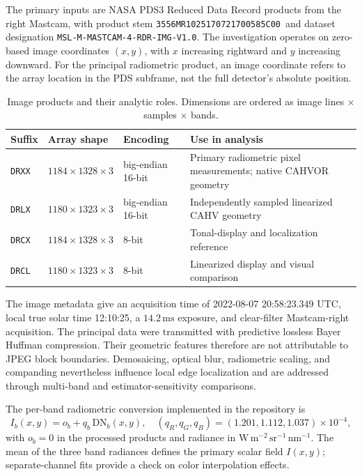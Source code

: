\documentclass[11pt,letterpaper]{article}
\newcommand{\pdsid}{\texttt{3556MR1025170721700585C00}}
\begin{document}
The primary inputs are NASA PDS3 Reduced Data Record products from the right Mastcam, with product stem \pdsid\ and dataset designation \texttt{MSL-M-MASTCAM-4-RDR-IMG-V1.0}. The investigation operates on zero-based image coordinates \((x,y)\), with \(x\) increasing rightward and \(y\) increasing downward. For the principal radiometric product, an image coordinate refers to the array location in the PDS subframe, not the full detector's absolute position.

\begin{table}[ht]
\centering\small
\caption{Image products and their analytic roles. Dimensions are ordered as image lines \(\times\) samples \(\times\) bands.}
\label{tab:products}
\begin{tabularx}{\linewidth}{@{}l l l X@{}}
\toprule
\textbf{Suffix} & \textbf{Array shape} & \textbf{Encoding} & \textbf{Use in analysis} \\
\midrule
\texttt{DRXX} & \(1184\times1328\times3\) & big-endian 16-bit & Primary radiometric pixel measurements; native CAHVOR geometry \\
\texttt{DRLX} & \(1180\times1323\times3\) & big-endian 16-bit & Independently sampled linearized CAHV geometry \\
\texttt{DRCX} & \(1184\times1328\times3\) & 8-bit & Tonal-display and localization reference \\
\texttt{DRCL} & \(1180\times1323\times3\) & 8-bit & Linearized display and visual comparison \\
\bottomrule
\end{tabularx}
\end{table}

The image metadata give an acquisition time of 2022-08-07 20:58:23.349 UTC, local true solar time 12:10:25, a \(14.2\,\mathrm{ms}\) exposure, and clear-filter Mastcam-right acquisition. The principal data were transmitted with predictive lossless Bayer Huffman compression. Their geometric features therefore are not attributable to JPEG block boundaries. Demosaicing, optical blur, radiometric scaling, and companding nevertheless influence local edge localization and are addressed through multi-band and estimator-sensitivity comparisons.

The per-band radiometric conversion implemented in the repository is
\begin{equation}
I_b(x,y)=o_b+q_b\,\mathrm{DN}_b(x,y),\quad
(q_R,q_G,q_B)=(1.201,1.112,1.037)\times10^{-4},
\label{eq:radiance}
\end{equation}
with \(o_b=0\) in the processed products and radiance in \(\mathrm{W\,m^{-2}\,sr^{-1}\,nm^{-1}}\). The mean of the three band radiances defines the primary scalar field \(I(x,y)\); separate-channel fits provide a check on color interpolation effects.
\end{document}
